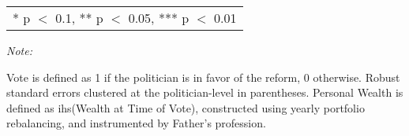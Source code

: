 \begin{table}[!h]
{\begin{threeparttable}
\begin{tabular}[t]{lcccccc}
\bottomrule
\multicolumn{7}{l}{\rule{0pt}{1em}* p $<$ 0.1, ** p $<$ 0.05, *** p $<$ 0.01}\\
\end{tabular}
\begin{tablenotes}[para]
\item \textit{Note: } 
\item Vote is defined as 1 if the politician is in favor of the reform, 0 otherwise. Robust standard errors clustered at the politician-level in parentheses. Personal Wealth is defined as ihs(Wealth at Time of Vote), constructed using yearly portfolio rebalancing, and instrumented by Father's profession.
\end{tablenotes}
\end{threeparttable}}
\end{table}
